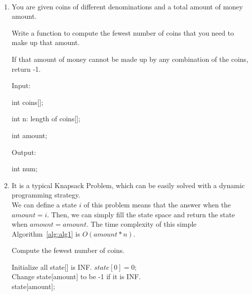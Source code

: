\documentclass[12pt,a4paper]{article}
\makeatletter
\newtheorem*{solution}{Solution}
\renewenvironment{solution}[1][Solution] {\par\pushQED{\qed}\normalfont\topsep6\p@\@plus6\p@\relax\trivlist\item[\hskip\labelsep\bfseries#1\@addpunct{.}]\ignorespaces}{\popQED\endtrivlist\@endpefalse} \makeatother
\makeatother
\begin{document}
\noindent

\noindent{}

~\\
\begin{enumerate}
\item You are given coins of different denominations and a total amount of money amount.

Write a function to compute the fewest number of coins that you need to make up that amount.

If that amount of money cannot be made up by any combination of the coins, return -1.






Input:

int coins[];

int n: length of coins[];

int amount;

Output:

int num;

\begin{solution}
It is a typical Knapsack Problem, which can be easily solved with a dynamic programming strategy. \\
We can define a state $i$ of this problem means that the answer when the $amount=i$. Then, we can simply fill the state space and return the state when $amount=amount$. The time complexity of this simple Algorithm~\ref{alg:alg1} is $O(amount*n)$.


\begin{algorithm} 
  \label{alg:alg1}
  \caption{Compute the fewest number of coins.} 
  Initialize all state[] is INF.
  $state[0] = 0$;\\
  Change state[amount] to be -1 if it is INF.\\
  \Return state[amount];
\end{algorithm}
~\\
~\\


\end{solution}
\end{enumerate}
\end{document}
